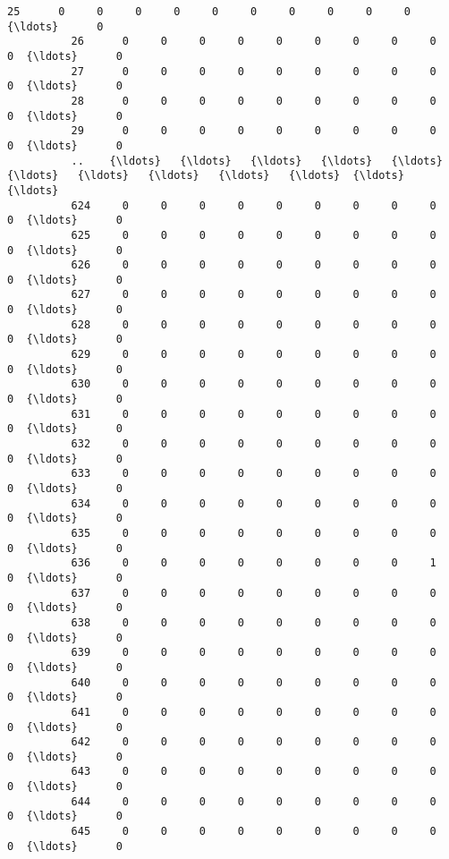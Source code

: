 \documentclass[11pt]{article}
\begin{document}
\begin{Verbatim}[commandchars=\\\{\}]
          25      0     0     0     0     0     0     0     0     0     0  {\ldots}      0   
          26      0     0     0     0     0     0     0     0     0     0  {\ldots}      0   
          27      0     0     0     0     0     0     0     0     0     0  {\ldots}      0   
          28      0     0     0     0     0     0     0     0     0     0  {\ldots}      0   
          29      0     0     0     0     0     0     0     0     0     0  {\ldots}      0   
          ..    {\ldots}   {\ldots}   {\ldots}   {\ldots}   {\ldots}   {\ldots}   {\ldots}   {\ldots}   {\ldots}   {\ldots}  {\ldots}    {\ldots}   
          624     0     0     0     0     0     0     0     0     0     0  {\ldots}      0   
          625     0     0     0     0     0     0     0     0     0     0  {\ldots}      0   
          626     0     0     0     0     0     0     0     0     0     0  {\ldots}      0   
          627     0     0     0     0     0     0     0     0     0     0  {\ldots}      0   
          628     0     0     0     0     0     0     0     0     0     0  {\ldots}      0   
          629     0     0     0     0     0     0     0     0     0     0  {\ldots}      0   
          630     0     0     0     0     0     0     0     0     0     0  {\ldots}      0   
          631     0     0     0     0     0     0     0     0     0     0  {\ldots}      0   
          632     0     0     0     0     0     0     0     0     0     0  {\ldots}      0   
          633     0     0     0     0     0     0     0     0     0     0  {\ldots}      0   
          634     0     0     0     0     0     0     0     0     0     0  {\ldots}      0   
          635     0     0     0     0     0     0     0     0     0     0  {\ldots}      0   
          636     0     0     0     0     0     0     0     0     1     0  {\ldots}      0   
          637     0     0     0     0     0     0     0     0     0     0  {\ldots}      0   
          638     0     0     0     0     0     0     0     0     0     0  {\ldots}      0   
          639     0     0     0     0     0     0     0     0     0     0  {\ldots}      0   
          640     0     0     0     0     0     0     0     0     0     0  {\ldots}      0   
          641     0     0     0     0     0     0     0     0     0     0  {\ldots}      0   
          642     0     0     0     0     0     0     0     0     0     0  {\ldots}      0   
          643     0     0     0     0     0     0     0     0     0     0  {\ldots}      0   
          644     0     0     0     0     0     0     0     0     0     0  {\ldots}      0   
          645     0     0     0     0     0     0     0     0     0     0  {\ldots}      0   

\end{Verbatim}
\end{document}
